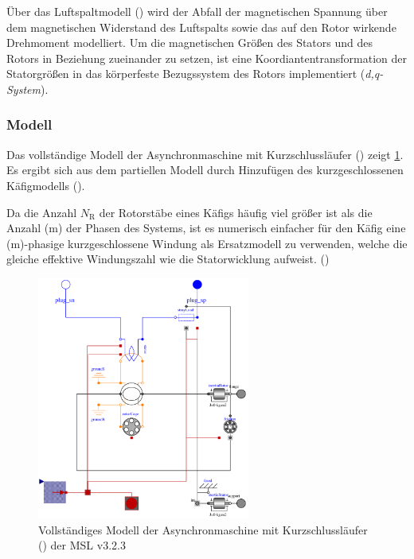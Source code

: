 
Über das Luftspaltmodell () wird der Abfall der magnetischen Spannung über dem magnetischen Widerstand des Luftspalts sowie das auf den Rotor wirkende Drehmoment modelliert. Um die magnetischen Größen des Stators und des Rotors in Beziehung zueinander zu setzen, ist eine Koordiantentransformation der Statorgrößen in das körperfeste Bezugssystem des Rotors implementiert (\emph{d,q-System}).

\hypertarget{sec:modell-ASM}{%
\subsubsection{Modell}\label{sec:modell-ASM}}

Das vollständige Modell der Asynchronmaschine mit Kurzschlussläufer () zeigt \cref{fig:ASM_vollstaendig}. Es ergibt sich aus dem partiellen Modell durch Hinzufügen des kurzgeschlossenen Käfigmodells ().

Da die Anzahl \(N_{\mathrm{R}}\) der Rotorstäbe eines Käfigs häufig viel größer ist als die Anzahl (m) der Phasen des Systems, ist es numerisch einfacher für den Käfig eine (m)-phasige kurzgeschlossene Windung als Ersatzmodell zu verwenden, welche die gleiche effektive Windungszahl wie die Statorwicklung aufweist. (\cite[S. 194]{kralModelicaObjektorientierteModellbildung2019})

\begin{figure}
\centering
\includegraphics[height=8cm]{Bilder/AIM_SquirrelCage.pdf}
\caption{Vollständiges Modell der Asynchronmaschine mit Kurzschlussläufer () der MSL v3.2.3}
\label{fig:ASM_vollstaendig}
\end{figure}

